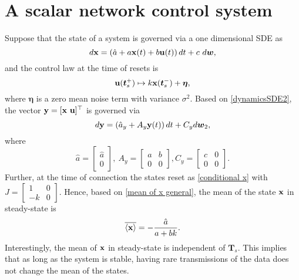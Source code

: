 \documentclass[letterpaper, 10 pt,one column, conference]{ieeeconf}  %
\begin{document}
\section{A scalar network control system}
Suppose that the state of a system is governed via a one dimensional SDE as
\begin{equation}
d\bold x= \left(\hat{a}+a \bold x(t)+b \bold u(t)\right)dt + c  \ d \boldsymbol w,
		\label{dynamicsSDE00}	
		\end{equation}
and the control law at the time of resets is
\begin{equation}
\bold u (\boldsymbol t_s^+) \mapsto k \bold x(\boldsymbol  t_s^-)+\boldsymbol \eta, \label{reset000}
\end{equation}
where $\boldsymbol \eta$ is a zero mean noise term with variance $\sigma^2$. 
Based on \eqref{dynamicsSDE2}, the vector $\bold y=[\bold x \ \bold u]^\top $ is governed via 
\begin{equation}
d\bold y= \left(\hat{a}_y+A_y \bold y (t)\right)dt + C_yd \boldsymbol w_2 ,
		\label{dynamicsSDE0}	
\end{equation}
where 
	\begin{equation}
 \hat{a}= \left[\begin{array}{c}
	\hat{a}\\ 0  
	\end{array}\right],  \  A_y= \left[\begin{array}{cc}
	a & b\\ 0 & 0 
	\end{array}\right],
C_y= \left[\begin{array}{cc}
	c & 0\\ 0 & 0 	\end{array}\right].
	\end{equation}
Further, at the time of connection the states reset as \eqref{conditional x} with $J= \left[\begin{array}{cc}
	1& 0\\ - k & 0 	\end{array}\right]$.
Hence, based on \eqref{mean of x general}, the mean of the state $\bold x$ in steady-state is 
\begin{equation} \label{mean}
\overline{\langle {\bold{x}} \rangle} = -\frac{\hat{a}}{a+bk}.
\end{equation}	
Interestingly, the mean of $\bold x$ in steady-state is independent of $\boldsymbol T_s$. This implies that as long as the system is stable, having rare transmissions of the data does not change the mean of the states. 	
\end{document}
